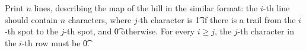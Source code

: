 Print $n$ lines, describing the map of the hill in the similar format: the $i$-th line should contain $n$ characters, where $j$-th character is \t{1} if there is a trail from the $i$-th spot to the $j$-th spot, and \t{0} otherwise. For every $i \ge j$, the $j$-th character in the $i$-th row must be \t{0}.